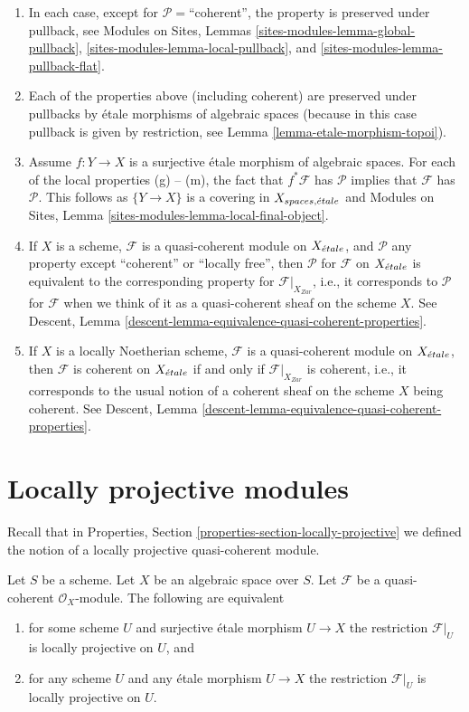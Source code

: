 \begin{enumerate}
\item In each case, except for $\mathcal{P}=$``coherent'', the property
is preserved under pullback, see
Modules on Sites, Lemmas \ref{sites-modules-lemma-global-pullback},
\ref{sites-modules-lemma-local-pullback}, and
\ref{sites-modules-lemma-pullback-flat}.
\item Each of the properties above (including coherent) are preserved under
pullbacks by \'etale morphisms of algebraic spaces (because in this
case pullback is given by restriction, see
Lemma \ref{lemma-etale-morphism-topoi}).
\item Assume $f : Y \to X$ is a surjective \'etale morphism of algebraic
spaces. For each of the local properties (g) -- (m), the fact that
$f^*\mathcal{F}$ has $\mathcal{P}$ implies that $\mathcal{F}$ has
$\mathcal{P}$. This follows as $\{Y \to X\}$ is a covering in
$X_{spaces, {\acute{e}tale}}$ and
Modules on Sites, Lemma \ref{sites-modules-lemma-local-final-object}.
\item If $X$ is a scheme, $\mathcal{F}$ is a quasi-coherent module
on $X_{\acute{e}tale}$, and $\mathcal{P}$ any property except ``coherent'' or
``locally free'', then $\mathcal{P}$ for $\mathcal{F}$ on $X_{\acute{e}tale}$
is equivalent to the corresponding property for
$\mathcal{F}|_{X_{Zar}}$, i.e., it corresponds to $\mathcal{P}$
for $\mathcal{F}$ when we think of it as a quasi-coherent sheaf
on the scheme $X$. See
Descent, Lemma \ref{descent-lemma-equivalence-quasi-coherent-properties}.
\item If $X$ is a locally Noetherian scheme, $\mathcal{F}$ is a
quasi-coherent module on $X_{\acute{e}tale}$, then $\mathcal{F}$
is coherent on $X_{\acute{e}tale}$ if and only if
$\mathcal{F}|_{X_{Zar}}$ is coherent, i.e., it corresponds to
the usual notion of a coherent sheaf on the scheme $X$ being
coherent. See
Descent, Lemma \ref{descent-lemma-equivalence-quasi-coherent-properties}.
\end{enumerate}



\section{Locally projective modules}
\label{section-locally-projective}

\noindent
Recall that in
Properties, Section \ref{properties-section-locally-projective}
we defined the notion of a locally projective
quasi-coherent module.

\begin{lemma}
\label{lemma-locally-projective}
Let $S$ be a scheme. Let $X$ be an algebraic space over $S$.
Let $\mathcal{F}$ be a quasi-coherent $\mathcal{O}_X$-module.
The following are equivalent
\begin{enumerate}
\item for some scheme $U$ and surjective \'etale morphism
$U \to X$ the restriction $\mathcal{F}|_U$ is locally projective
on $U$, and
\item for any scheme $U$ and any \'etale morphism
$U \to X$ the restriction $\mathcal{F}|_U$ is locally projective
on $U$.
\end{enumerate}
\end{lemma}

